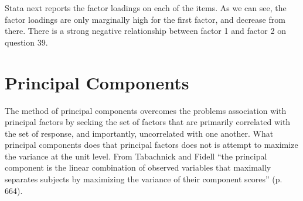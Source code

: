 \documentclass[12pt]{article}
\begin{document}
Stata next reports the factor loadings on each of the items. As we can
see, the factor loadings are only marginally high for the first
factor, and decrease from there. There is a strong negative
relationship between factor 1 and factor 2 on question 39. 

\section{Principal Components}

The method of principal components overcomes the problems association
with principal factors by seeking the set of factors that are
primarily correlated with the set of response, and importantly,
uncorrelated with one another. What principal components does that
principal factors does not is attempt to maximize the variance at the
unit level. From Tabachnick and Fidell ``the principal component is
the linear combination of observed variables that maximally separates
subjects by maximizing the variance of their component scores''
(p. 664). 
\end{document}
